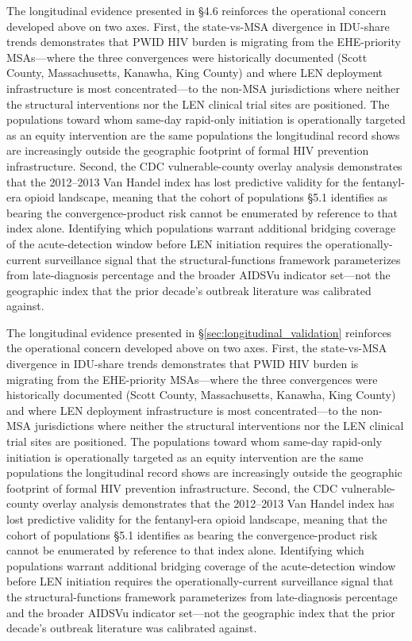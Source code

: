 \documentclass[12pt]{article}
\begin{document}
The longitudinal evidence presented in \S 4.6 reinforces the operational concern developed above on two axes. First, the state-vs-MSA divergence in IDU-share trends demonstrates that PWID HIV burden is migrating from the EHE-priority MSAs---where the three convergences were historically documented (Scott County, Massachusetts, Kanawha, King County) and where LEN deployment infrastructure is most concentrated---to the non-MSA jurisdictions where neither the structural interventions nor the LEN clinical trial sites are positioned. The populations toward whom same-day rapid-only initiation is operationally targeted as an equity intervention are the same populations the longitudinal record shows are increasingly outside the geographic footprint of formal HIV prevention infrastructure. Second, the CDC vulnerable-county overlay analysis demonstrates that the 2012--2013 Van Handel index has lost predictive validity for the fentanyl-era opioid landscape, meaning that the cohort of populations \S 5.1 identifies as bearing the convergence-product risk cannot be enumerated by reference to that index alone. Identifying which populations warrant additional bridging coverage of the acute-detection window before LEN initiation requires the operationally-current surveillance signal that the structural-functions framework parameterizes from late-diagnosis percentage and the broader AIDSVu indicator set---not the geographic index that the prior decade's outbreak literature was calibrated against.

The longitudinal evidence presented in §\ref{sec:longitudinal_validation} reinforces the operational concern developed above on two axes. First, the state-vs-MSA divergence in IDU-share trends demonstrates that PWID HIV burden is migrating from the EHE-priority MSAs---where the three convergences were historically documented (Scott County, Massachusetts, Kanawha, King County) and where LEN deployment infrastructure is most concentrated---to the non-MSA jurisdictions where neither the structural interventions nor the LEN clinical trial sites are positioned. The populations toward whom same-day rapid-only initiation is operationally targeted as an equity intervention are the same populations the longitudinal record shows are increasingly outside the geographic footprint of formal HIV prevention infrastructure. Second, the CDC vulnerable-county overlay analysis demonstrates that the 2012--2013 Van Handel index has lost predictive validity for the fentanyl-era opioid landscape, meaning that the cohort of populations §5.1 identifies as bearing the convergence-product risk cannot be enumerated by reference to that index alone. Identifying which populations warrant additional bridging coverage of the acute-detection window before LEN initiation requires the operationally-current surveillance signal that the structural-functions framework parameterizes from late-diagnosis percentage and the broader AIDSVu indicator set---not the geographic index that the prior decade's outbreak literature was calibrated against.
\end{document}
